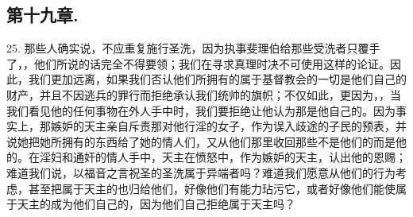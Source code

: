 
\subsection{第十九章.}

25. 那些人确实说，不应重复施行圣洗，因为执事斐理伯给那些受洗者只覆手了，，他们所说的话完全不得要领；我们在寻求真理时决不可使用这样的论证。因此，我们更加远离，如果我们否认他们所拥有的属于基督教会的一切是他们自己的财产，并且不因逃兵的罪行而拒绝承认我们统帅的旗帜；不仅如此，更因为，，当我们看见他的任何事物在外人手中时，我们要拒绝让他认为那是他自己的。因为事实上，那嫉妒的天主亲自斥责那对他行淫的女子，作为误入歧途的子民的预表，并说她把她所拥有的东西给了她的情人们，又从他们那里收回那些不是他们的而是他的。在淫妇和通奸的情人手中，天主在愤怒中，作为嫉妒的天主，认出他的恩赐；难道我们说，以福音之言祝圣的圣洗属于异端者吗？难道我们愿意从他们的行为考虑，甚至把属于天主的也归给他们，好像他们有能力玷污它，或者好像他们能使属于天主的成为他们自己的，因为他们自己拒绝属于天主吗？\par

